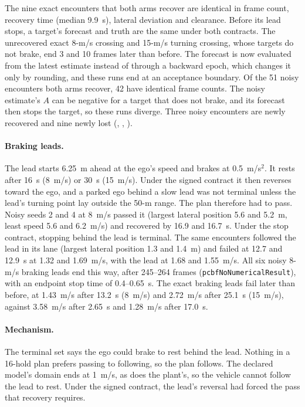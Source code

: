 \documentclass[11pt]{article}
\begin{document}
The nine exact encounters that both arms recover are identical in frame
count, recovery time (median 9.9~s), lateral deviation and clearance. Before
its lead stops, a target's forecast and truth are the same under both
contracts. The unrecovered exact 8-m/s crossing and 15-m/s turning crossing,
whose targets do not brake, end 3 and 10 frames later than before. The
forecast is now evaluated from the latest estimate instead of through a
backward epoch, which changes it only by rounding, and these runs end at an
acceptance boundary. Of the 51 noisy encounters both arms recover, 42 have identical
frame counts. The noisy estimate's $A$ can be negative for a target that
does not brake, and its forecast then stops the target, so these runs
diverge. Three noisy encounters are newly recovered and nine newly lost
(, , ).

\paragraph{Braking leads.}
The lead starts 6.25~m ahead at the ego's speed and brakes at 0.5~m/s$^2$.
It rests after 16~s (8~m/s) or 30~s (15~m/s). Under the signed contract it
then reverses toward the ego, and a parked ego behind a slow lead was not
terminal unless the lead's turning point lay outside the 50-m range. The
plan therefore had to pass. Noisy seeds 2 and 4 at 8~m/s passed it (largest
lateral position 5.6 and 5.2~m, least speed 5.6 and 6.2~m/s) and recovered
by 16.9 and 16.7~s. Under the stop contract, stopping behind the lead is
terminal. The same encounters followed the lead in its lane (largest lateral
position 1.3 and 1.4~m) and failed at 12.7 and 12.9~s at 1.32 and 1.69~m/s,
with the lead at 1.68 and 1.55~m/s. All six noisy 8-m/s braking leads end
this way, after 245--264 frames (\texttt{pcbfNoNumericalResult}), with an
endpoint stop time of 0.4--0.65~s. The exact braking leads fail later than
before, at 1.43~m/s after 13.2~s (8~m/s) and 2.72~m/s after 25.1~s (15~m/s),
against 3.58~m/s after 2.65~s and 1.28~m/s after 17.0~s.

\paragraph{Mechanism.}
The terminal set says the ego could brake to rest behind the lead. Nothing
in a 16-hold plan prefers passing to following, so the plan follows. The
declared model's domain ends at 1~m/s, as does the plant's, so the vehicle
cannot follow the lead to rest. Under the signed contract, the lead's
reversal had forced the pass that recovery requires.
\end{document}
